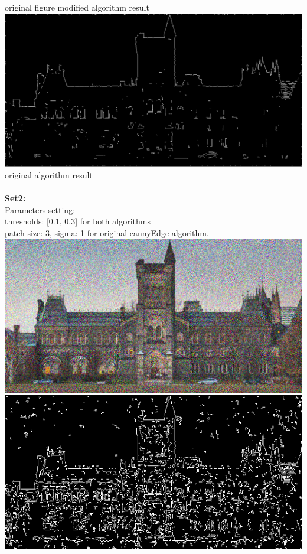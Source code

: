 \documentclass[10pt,twocolumn,letterpaper]{article}
\begin{document}
original figure \hspace{45pt} modified algorithm result\\
\includegraphics[scale=0.1]{result_original_noise_40.png}\\
original algorithm result\\
\\
\textbf{Set2:}\\
Parameters setting:\\
thresholds: [0.1, 0.3] for both algorithms\\
patch size: 3, sigma: 1 for original cannyEdge algorithm.\\
\includegraphics[scale=0.1]{UofT-noise-60.png}
\includegraphics[scale=0.2]{pyramid_edge_noise_60.png}\\
\end{document}
